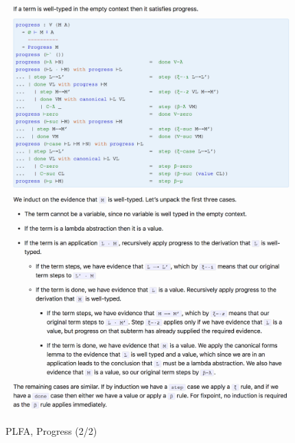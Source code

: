 \documentclass[preprint,authoryear]{elsarticle}
\begin{document}
\begin{figure}[p]
  \includegraphics[width=\textwidth]{figures/plfa-progress-2.png}
  \includegraphics[width=\textwidth]{figures/plfa-progress-3a.png}
  \caption{PLFA, Progress (2/2)}
  \label{fig:plfa-progress-2}
\end{figure}  
\end{document}
